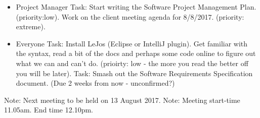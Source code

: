 \documentclass[11pt, a4paper]{article}
\begin{document}
\begin{flushleft}
\begin{itemize}
  \item Project Manager
  \linebreak Task: Start writing the Software Project Management Plan. (priority:low). Work on the client meeting agenda for 8/8/2017. (priority: extreme).
  \item Everyone
  \linebreak Task: Install LeJos (Eclipse or IntelliJ plugin). Get familiar with the syntax, read a bit of the docs  and perhaps some code online to figure out what we can and can't do. (prioirty: low - the more you read the better off you will be later).
  \linebreak Task: Smash out the Software Requirements Specification document. (Due 2 weeks from now - unconfirmed?)
  \end{itemize}
  \vspace*{10pt}
  \noindent Note: Next meeting to be held on 13 August 2017.
  \noindent\linebreak Note: Meeting start-time 11.05am. End time 12.10pm.
  \end{flushleft}

  
\end{document}
